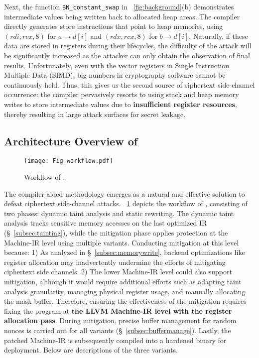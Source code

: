 Next, the function \texttt{BN\_constant\_swap} in \F~\ref{fig:background}(b) demonstrates intermediate values being written back to allocated heap areas.
The compiler directly generates store instructions that point to heap memories, using $(rdi, rcx, 8)$ for $a\rightarrow d[i]$ and $(rdx, rcx, 8)$ for $b\rightarrow d[i]$.
Naturally, if these data are stored in registers during their lifecycles, the difficulty of the attack will be significantly increased as the attacker can only obtain the observation of final results. 
Unfortunately, even with the vector registers in Single Instruction Multiple Data (SIMD), big numbers in cryptography software cannot be continuously held. 
Thus, this gives us the second source of ciphertext side-channel occurrence: the compiler pervasively resorts to using stack and heap memory writes to store intermediate values due to \textbf{insufficient register resources}, thereby resulting in large attack surfaces for secret leakage.

\subsection{Architecture Overview of \tool}
\label{subsec:workflow}

\begin{figure}[t]
\centering
\texttt{[image: Fig\_workflow.pdf]}
\caption{Workflow of \tool.}
\label{fig:workflow}
\end{figure}

The compiler-aided methodology emerges as a natural and effective solution to defeat ciphertext side-channel attacks.
\F~\ref{fig:workflow} depicts the workflow of \tool, consisting of two phases: dynamic taint analysis and static rewriting.
The dynamic taint analysis tracks sensitive memory accesses on the last optimized IR (\S~\ref{subsec:tainting}), while the mitigation phase applies protection at the Machine-IR level using multiple variants.
Conducting mitigation at this level because: 
1) As analyzed in \S~\ref{subsec:memorywrite}, backend optimizations like register allocation may inadvertently undermine the efforts of mitigating ciphertext side channels.
2) The lower Machine-IR level could also support mitigation, although it would require additional efforts such as adapting taint analysis granularity, managing physical register usage, and manually allocating the mask buffer.
Therefore, ensuring the effectiveness of the mitigation requires fixing the program at \textbf{the LLVM Machine-IR level with the register allocation pass}.
During mitigation, precise buffer management for random nonces is carried out for all variants (\S~\ref{subsec:buffermanage}).
Lastly, the patched Machine-IR is subsequently compiled into a hardened binary for deployment.
Below are descriptions of the three variants.

